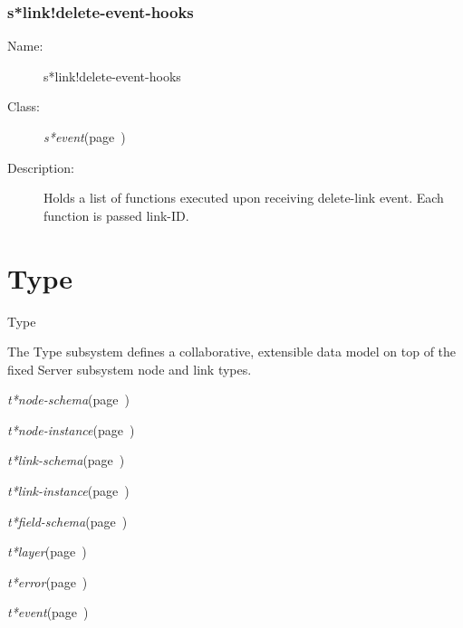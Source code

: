 \subsection{s*link!delete-event-hooks}
\label{s*link!delete-event-hooks}

\begin{description}
\item [Name:]  s*link!delete-event-hooks

\item [Class:]
{\sl s*event}\hfill(page~\pageref{s*event})

\item [Description:]
Holds a list of functions executed upon receiving
delete-link event.  Each function is passed link-ID.


\end{description}
\horizontalline

\chapter{Type}
\label{Type}

\begin{description}
\item [Name:]  Type

\item [Description:]

The Type subsystem defines a collaborative, extensible
data model on top of the fixed Server subsystem node
and link types.  

\item [Public-classes:]
\item {\sl t*node-schema}\hfill(page~\pageref{t*node-schema})
\item {\sl t*node-instance}\hfill(page~\pageref{t*node-instance})

\item {\sl t*link-schema}\hfill(page~\pageref{t*link-schema})
\item {\sl t*link-instance}\hfill(page~\pageref{t*link-instance})

\item {\sl t*field-schema}\hfill(page~\pageref{t*field-schema})

\item {\sl t*layer}\hfill(page~\pageref{t*layer})

\item {\sl t*error}\hfill(page~\pageref{t*error})
\item {\sl t*event}\hfill(page~\pageref{t*event})

\end{description}
\horizontalline

